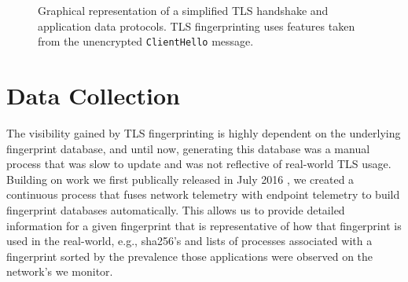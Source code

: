 \documentclass{book}
\begin{document}
\begin{figure}[t!]
        \centering
{}
\caption{Graphical representation of a simplified TLS handshake and application data protocols. TLS fingerprinting uses features taken from the unencrypted \texttt{ClientHello} message.}
\label{fig:tls_session}
\end{figure}


\section{Data Collection}

The visibility gained by TLS fingerprinting is highly dependent on the underlying fingerprint database, and until now, generating this database was a manual process that was slow to update and was not reflective of real-world TLS usage. Building on work we first publically released in July 2016 \cite{anderson17deciphering}, we created a continuous process that fuses network telemetry with endpoint telemetry to build fingerprint databases automatically. This allows us to provide detailed information for a given fingerprint that is representative of how that fingerprint is used in the real-world, e.g., sha256's and lists of processes associated with a fingerprint sorted by the prevalence those applications were observed on the network's we monitor.
\end{document}
